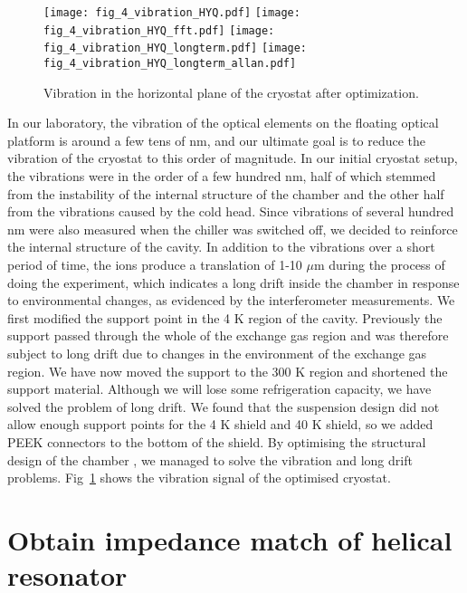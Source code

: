 \begin{figure}
    \centering
    {\texttt{[image: fig\_4\_vibration\_HYQ.pdf]}}
    {\texttt{[image: fig\_4\_vibration\_HYQ\_fft.pdf]}}
    {\texttt{[image: fig\_4\_vibration\_HYQ\_longterm.pdf]}}
    {\texttt{[image: fig\_4\_vibration\_HYQ\_longterm\_allan.pdf]}}
    \caption{Vibration in the horizontal plane of the cryostat after optimization.}
    \label{fig:fig_4_vibration_HYQ}
\end{figure}

In our laboratory, the vibration of the optical elements on the floating optical platform is around a few tens of nm, and our ultimate goal is to reduce the vibration of the cryostat to this order of magnitude. In our initial cryostat setup, the vibrations were in the order of a few hundred nm, half of which stemmed from the instability of the internal structure of the chamber and the other half from the vibrations caused by the cold head. Since vibrations of several hundred nm were also measured when the chiller was switched off, we decided to reinforce the internal structure of the cavity. In addition to the vibrations over a short period of time, the ions produce a translation of 1-10 $\mu$m during the process of doing the experiment, which indicates a long drift inside the chamber in response to environmental changes, as evidenced by the interferometer measurements. We first modified the support point in the 4 K region of the cavity. Previously the support passed through the whole of the exchange gas region and was therefore subject to long drift due to changes in the environment of the exchange gas region. We have now moved the support to the 300 K region and shortened the support material. Although we will lose some refrigeration capacity, we have solved the problem of long drift. We found that the suspension design did not allow enough support points for the 4 K shield and 40 K shield, so we added PEEK connectors to the bottom of the shield. By optimising the structural design of the chamber \cite{RN261}, we managed to solve the vibration and long drift problems. Fig~\ref{fig:fig_4_vibration_HYQ} shows the vibration signal of the optimised cryostat.



\section {Obtain impedance match of helical resonator}

